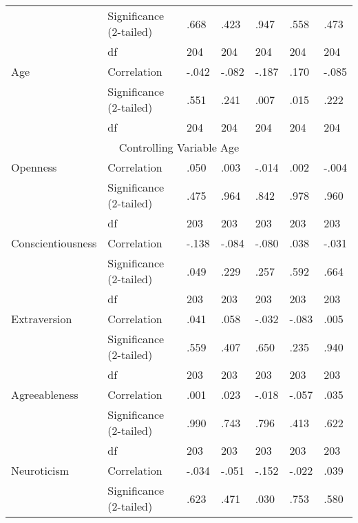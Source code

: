 \documentclass{llncs}
\begin{document}
\begin{table}[!ht]
\begin{tabular}{lllllll}
                  & Significance (2-tailed) & .668  & .423    & .947  & .558  & .473    \\
                  & df                      & 204   & 204     & 204   & 204   & 204     \\
Age               & Correlation             & -.042 & -.082   & -.187 & .170  & -.085   \\
                  & Significance (2-tailed) & .551  & .241    & .007  & .015  & .222    \\
                  & df                      & 204   & 204     & 204   & 204   & 204     \\
\multicolumn{7}{c}{Controlling Variable Age}                                            \\
Openness          & Correlation             & .050  & .003    & -.014 & .002  & -.004   \\
                  & Significance (2-tailed) & .475  & .964    & .842  & .978  & .960    \\
                  & df                      & 203   & 203     & 203   & 203   & 203     \\
Conscientiousness & Correlation             & -.138 & -.084   & -.080 & .038  & -.031   \\
                  & Significance (2-tailed) & .049  & .229    & .257  & .592  & .664    \\
                  & df                      & 203   & 203     & 203   & 203   & 203     \\
Extraversion      & Correlation             & .041  & .058    & -.032 & -.083 & .005    \\
                  & Significance (2-tailed) & .559  & .407    & .650  & .235  & .940    \\
                  & df                      & 203   & 203     & 203   & 203   & 203     \\
Agreeableness     & Correlation             & .001  & .023    & -.018 & -.057 & .035    \\
                  & Significance (2-tailed) & .990  & .743    & .796  & .413  & .622    \\
                  & df                      & 203   & 203     & 203   & 203   & 203     \\
Neuroticism       & Correlation             & -.034 & -.051   & -.152 & -.022 & .039    \\
                  & Significance (2-tailed) & .623  & .471    & .030  & .753  & .580    \\

\end{tabular}
\end{table}
\end{document}
